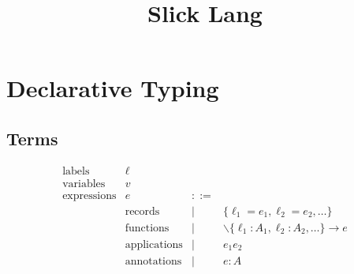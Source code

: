 \documentclass{article}
\title{Slick Lang}
\date{}
\author{}
\newcommand{\bnfvar}[1]{\langle \texttt{#1} \rangle}
\newcommand{\define}{::=}
\newcommand{\arrow}{\to}
\newcommand{\rcd}[1]{\{#1\}}
\newcommand{\lbl}{\ell}
\newcommand{\expr}{e}
\newcommand{\var}{v}
\newcommand{\tp}{A}
\begin{document}
\maketitle

% 
% 
% 

\section{Declarative Typing}

\subsection{Terms}

\[
  \begin{array}{llll}
    \text{labels} & \lbl & & \\
    \text{variables} & \var & & \\
    \text{expressions} & \expr & \define & \\
    & \text{records} & | & \rcd{\lbl_1=\expr_1, \lbl_2=\expr_2,\dots} \\
    & \text{functions} & | & \backslash \rcd{\lbl_1:\tp_1, \lbl_2:\tp_2,\dots}
                           \arrow \expr \\
    & \text{applications} & | & \expr_1 \expr_2 \\
    & \text{annotations} & | & \expr : \tp
  \end{array}
\]
\end{document}
